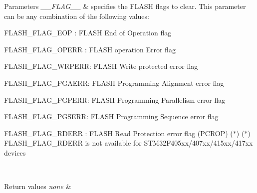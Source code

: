 \begin{DoxyParams}{Parameters}
{\em \+\_\+\+\_\+\+F\+L\+A\+G\+\_\+\+\_\+} & specifies the F\+L\+A\+SH flags to clear. This parameter can be any combination of the following values\+: \begin{DoxyItemize}
\item F\+L\+A\+S\+H\+\_\+\+F\+L\+A\+G\+\_\+\+E\+OP \+: F\+L\+A\+SH End of Operation flag \item F\+L\+A\+S\+H\+\_\+\+F\+L\+A\+G\+\_\+\+O\+P\+E\+RR \+: F\+L\+A\+SH operation Error flag \item F\+L\+A\+S\+H\+\_\+\+F\+L\+A\+G\+\_\+\+W\+R\+P\+E\+RR\+: F\+L\+A\+SH Write protected error flag \item F\+L\+A\+S\+H\+\_\+\+F\+L\+A\+G\+\_\+\+P\+G\+A\+E\+RR\+: F\+L\+A\+SH Programming Alignment error flag \item F\+L\+A\+S\+H\+\_\+\+F\+L\+A\+G\+\_\+\+P\+G\+P\+E\+RR\+: F\+L\+A\+SH Programming Parallelism error flag \item F\+L\+A\+S\+H\+\_\+\+F\+L\+A\+G\+\_\+\+P\+G\+S\+E\+RR\+: F\+L\+A\+SH Programming Sequence error flag \item F\+L\+A\+S\+H\+\_\+\+F\+L\+A\+G\+\_\+\+R\+D\+E\+RR \+: F\+L\+A\+SH Read Protection error flag (P\+C\+R\+OP) ($\ast$) ($\ast$) F\+L\+A\+S\+H\+\_\+\+F\+L\+A\+G\+\_\+\+R\+D\+E\+RR is not available for S\+T\+M32\+F405xx/407xx/415xx/417xx devices ~\newline
\end{DoxyItemize}
\\
\hline
\end{DoxyParams}

\begin{DoxyRetVals}{Return values}
{\em none} & \\
\hline
\end{DoxyRetVals}
\mbox{\label{group___f_l_a_s_h___exported___macros_ga247f85a1fcc780be21f9fc2f1d29ee7e}} 
